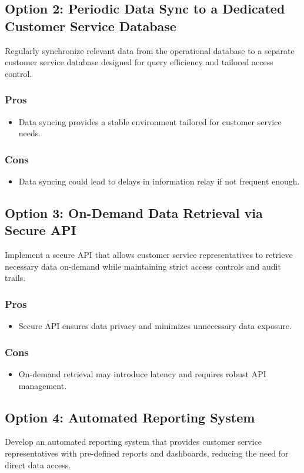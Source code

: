 \subsection*{Option 2: Periodic Data Sync to a Dedicated Customer Service Database}
Regularly synchronize relevant data from the operational database to a separate customer service database designed for query efficiency and tailored access control.
\subsubsection*{Pros}
\begin{itemize}
    \item Data syncing provides a stable environment tailored for customer service needs.
\end{itemize}
\subsubsection*{Cons}
\begin{itemize}
    \item Data syncing could lead to delays in information relay if not frequent enough.
\end{itemize}

\subsection*{Option 3: On-Demand Data Retrieval via Secure API}
Implement a secure API that allows customer service representatives to retrieve necessary data on-demand while maintaining strict access controls and audit trails.
\subsubsection*{Pros}
\begin{itemize}
    \item Secure API ensures data privacy and minimizes unnecessary data exposure.
\end{itemize}
\subsubsection*{Cons}
\begin{itemize}
    \item On-demand retrieval may introduce latency and requires robust API management.
\end{itemize}

\subsection*{Option 4: Automated Reporting System}
Develop an automated reporting system that provides customer service representatives with pre-defined reports and dashboards, reducing the need for direct data access.
